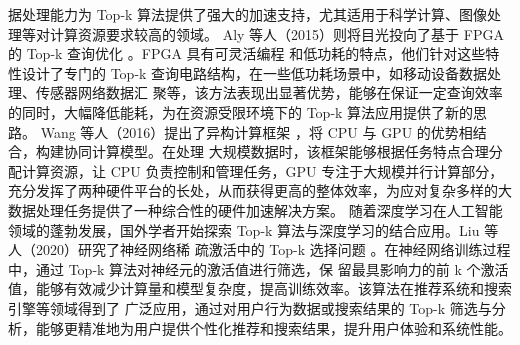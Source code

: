 据处理能力为 Top-k 算法提供了强大的加速支持，尤其适用于科学计算、图像处理等对计算资源要求较高的领域。
Aly 等人（2015）则将目光投向了基于 FPGA 的 Top-k 查询优化 \cite {aly2015}。FPGA 具有可灵活编程
和低功耗的特点，他们针对这些特性设计了专门的 Top-k 查询电路结构，在一些低功耗场景中，如移动设备数据处理、传感器网络数据汇
聚等，该方法表现出显著优势，能够在保证一定查询效率的同时，大幅降低能耗，为在资源受限环境下的 Top-k 算法应用提供了新的思路。
Wang 等人（2016）提出了异构计算框架 \cite {wang2016}，将 CPU 与 GPU 的优势相结合，构建协同计算模型。在处理
大规模数据时，该框架能够根据任务特点合理分配计算资源，让 CPU 负责控制和管理任务，GPU 专注于大规模并行计算部分，充分发挥了两种硬件平台的长处，从而获得更高的整体效率，为应对复杂多样的大数据处理任务提供了一种综合性的硬件加速解决方案。
随着深度学习在人工智能领域的蓬勃发展，国外学者开始探索 Top-k 算法与深度学习的结合应用。Liu 等人（2020）研究了神经网络稀
疏激活中的 Top-k 选择问题 \cite {liu2020}。在神经网络训练过程中，通过 Top-k 算法对神经元的激活值进行筛选，保
留最具影响力的前 k 个激活值，能够有效减少计算量和模型复杂度，提高训练效率。该算法在推荐系统和搜索引擎等领域得到了
广泛应用，通过对用户行为数据或搜索结果的 Top-k 筛选与分析，能够更精准地为用户提供个性化推荐和搜索结果，提升用户体验和系统性能。





    

